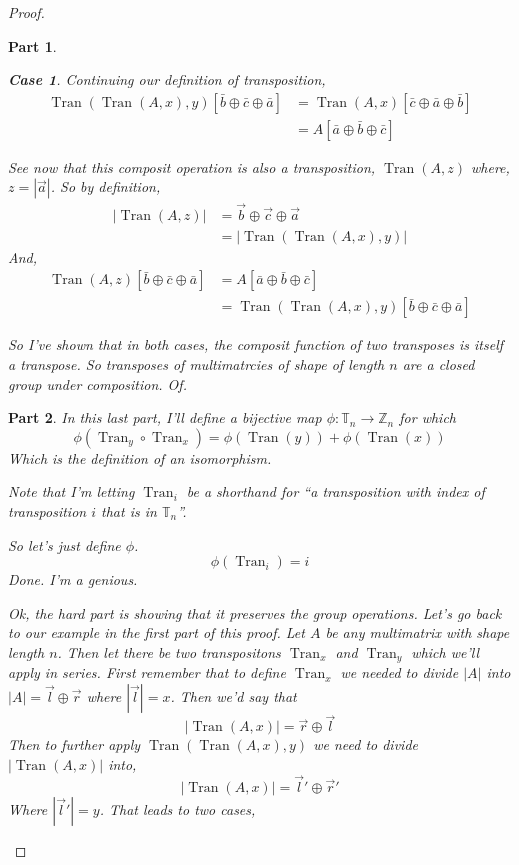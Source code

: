 \documentclass[12pt]{book}
\theoremstyle{definition}
\theoremstyle{plain}
\theoremstyle{ppart}
\newtheorem{ppart}{Part}
\theoremstyle{case}
\newtheorem{case}{Case}
\theoremstyle{solution}
\DeclareMathOperator{\Tran}{Tran}
\begin{document}
\begin{proof}
\begin{ppart}
\begin{case}
Continuing our definition of transposition,
\begin{align*}
  \Tran(\Tran(A, x), y)[\bar{b} \oplus \bar{c} \oplus \bar{a}]
  &=
  \Tran(A, x)[\bar{c} \oplus \bar{a} \oplus \bar{b}] \\
  &=
  A[\bar{a} \oplus \bar{b} \oplus \bar{c}]
\end{align*}

See now that this composit operation is also a transposition, $\Tran(A, z)$ where,
$z = |\vec{a}|$.
So by definition,
\begin{align*}
  |\Tran(A, z)|
  &=
  \vec{b} \oplus \vec{c} \oplus \vec{a} \\
  &=
  |\Tran(\Tran(A, x), y)|  
\end{align*}
And,
\begin{align*}
  \Tran(A, z)[\bar{b} \oplus \bar{c} \oplus \bar{a}]
  &=
  A[\bar{a} \oplus \bar{b} \oplus \bar{c}] \\
  &=
  \Tran(\Tran(A, x), y)[\bar{b} \oplus \bar{c} \oplus \bar{a}]
\end{align*}
\end{case}

So I've shown that in both cases, the composit function of two transposes is
itself a transpose. So transposes of multimatrcies of shape of length $n$ are
a closed group under composition. Of.
\end{ppart}

\begin{ppart}
In this last part, I'll define a bijective map
$\phi: \mathbb{T}_n \to \mathbb{Z}_n$ for which
\[ \phi(\Tran_y \circ \Tran_x) = \phi(\Tran(y)) + \phi(\Tran(x)) \]
Which is the definition of an isomorphism.

Note that I'm letting $\Tran_i$ be a shorthand for ``a transposition
with index of transposition $i$ that is in $\mathbb{T}_n$''.

So let's just define $\phi$.
\[ \phi(\Tran_i) = i \]
Done. I'm a genious.

Ok, the hard part is showing that it preserves the group operations.
Let's go back to our example in the first part of this proof. Let $A$ be
any multimatrix with shape length $n$. Then let there be two transpositons
$\Tran_x$ and $\Tran_y$ which we'll apply in series. First remember that
to define $\Tran_x$ we needed to divide $|A|$ into $|A| = \vec{l} \oplus \vec{r}$
where $|\vec{l}| = x$. Then we'd say that
\[ |\Tran(A, x)| = \vec{r} \oplus \vec{l} \]
Then to further apply $\Tran(\Tran(A, x), y)$ we need to divide $|\Tran(A,x)|$
into,
\[ |\Tran(A, x)| = \vec{l}' \oplus \vec{r}' \]
Where $|\vec{l}'| = y$.
That leads to two cases,


\end{ppart}
\end{proof}
\end{document}
